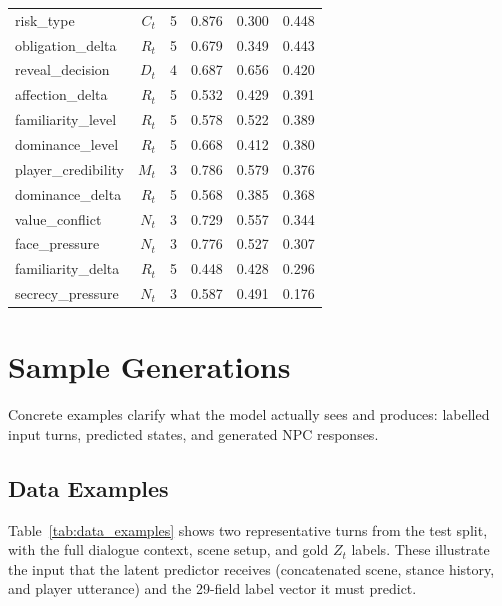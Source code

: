 \documentclass[11pt]{article}
\begin{document}
\begin{table}[tp]
\begin{tabular}{@{}lrrrrr@{}}
risk\_type        & $C_t$ & 5  & 0.876 & 0.300 & 0.448 \\
obligation\_delta & $R_t$ & 5  & 0.679 & 0.349 & 0.443 \\
reveal\_decision  & $D_t$ & 4  & 0.687 & 0.656 & 0.420 \\
affection\_delta  & $R_t$ & 5  & 0.532 & 0.429 & 0.391 \\
familiarity\_level& $R_t$ & 5  & 0.578 & 0.522 & 0.389 \\
dominance\_level  & $R_t$ & 5  & 0.668 & 0.412 & 0.380 \\
player\_credibility & $M_t$ & 3 & 0.786 & 0.579 & 0.376 \\
dominance\_delta  & $R_t$ & 5  & 0.568 & 0.385 & 0.368 \\
value\_conflict   & $N_t$ & 3  & 0.729 & 0.557 & 0.344 \\
face\_pressure    & $N_t$ & 3  & 0.776 & 0.527 & 0.307 \\
familiarity\_delta& $R_t$ & 5  & 0.448 & 0.428 & 0.296 \\
secrecy\_pressure & $N_t$ & 3  & 0.587 & 0.491 & 0.176 \\
\bottomrule
\end{tabular}
\end{table}

\section{Sample Generations}
\label{app:samples}

Concrete examples clarify what the model actually sees and produces: labelled input turns, predicted states, and generated NPC responses.

\subsection{Data Examples}
\label{app:data_examples}

Table~\ref{tab:data_examples} shows two representative turns from the test split, with the full dialogue context, scene setup, and gold $Z_t$ labels.
These illustrate the input that the latent predictor receives (concatenated scene, stance history, and player utterance) and the 29-field label vector it must predict.
\end{document}
